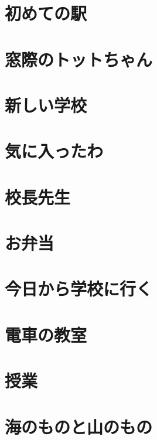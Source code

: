 \documentclass[12pt,a4paper,oneside,openany]{book}
\begin{document}
\tableofcontents

\chapter{初めての駅}


\chapter{窓際のトットちゃん}


\chapter{新しい学校}


\chapter{気に入ったわ}


\chapter{校長先生}


\chapter{お弁当}


\chapter{今日から学校に行く}


\chapter{電車の教室}


\chapter{授業}


\chapter{海のものと山のもの}

\end{document}
